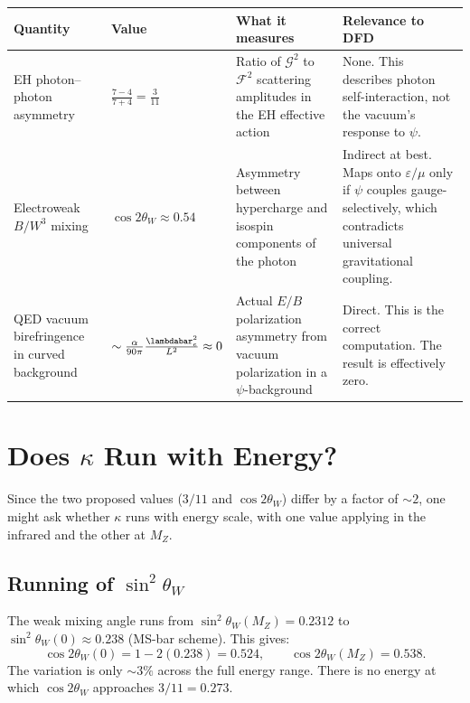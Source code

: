 \documentclass[11pt,a4paper]{article}
\begin{document}
\begin{center}
\renewcommand{\arraystretch}{1.4}
\begin{tabular}{p{3cm}p{3cm}p{3cm}p{3cm}}
\toprule
\textbf{Quantity} & \textbf{Value} & \textbf{What it measures} &
\textbf{Relevance to DFD} \\
\midrule
EH photon--photon asymmetry &
$\frac{7-4}{7+4} = \frac{3}{11}$ &
Ratio of $\mathcal{G}^2$ to $\mathcal{F}^2$ scattering amplitudes
in the EH effective action &
None.  This describes photon self-interaction, not the vacuum's
response to $\psi$.  \\
\midrule
Electroweak $B/W^3$ mixing &
$\cos 2\theta_W \approx 0.54$ &
Asymmetry between hypercharge and isospin components of the photon &
Indirect at best.  Maps onto $\varepsilon/\mu$ only if $\psi$ couples
gauge-selectively, which contradicts universal gravitational coupling. \\
\midrule
QED vacuum birefringence in curved background &
$\sim\frac{\alpha}{90\pi}\frac{\lambdabar_e^2}{L^2} \approx 0$ &
Actual $E/B$ polarization asymmetry from vacuum polarization in a
$\psi$-background &
Direct.  This is the correct computation.  The result is effectively
zero. \\
\bottomrule
\end{tabular}
\end{center}

\section{Does $\kappa$ Run with Energy?}
\label{sec:running}

Since the two proposed values ($3/11$ and $\cos 2\theta_W$) differ by a
factor of $\sim 2$, one might ask whether $\kappa$ runs with energy scale,
with one value applying in the infrared and the other at $M_Z$.

\subsection{Running of $\sin^2\theta_W$}

The weak mixing angle runs from $\sin^2\theta_W(M_Z) = 0.2312$ to
$\sin^2\theta_W(0) \approx 0.238$ (MS-bar scheme).  This gives:
\begin{equation}
\cos 2\theta_W(0) = 1 - 2(0.238) = 0.524, \qquad
\cos 2\theta_W(M_Z) = 0.538.
\end{equation}
The variation is only $\sim 3\%$ across the full energy range.  There is
no energy at which $\cos 2\theta_W$ approaches $3/11 = 0.273$.
\end{document}
